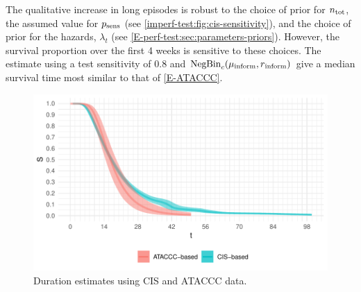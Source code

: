 \documentclass[thesis.tex]{subfiles}
\begin{document}
The qualitative increase in long episodes is robust to the choice of prior for $n_\text{tot}$, the assumed value for $p_\text{sens}$ (see \cref{imperf-test:fig:cis-sensitivity}), and the choice of prior for the hazards, $\lambda_t$ (see \cref{E-perf-test:sec:parameters-priors}).
However, the survival proportion over the first 4 weeks is sensitive to these choices.
The estimate using a test sensitivity of 0.8 and $\operatorname{NegBin}_{c}(\mu{_{\text{inform}}}, r{_{\text{inform}}})$ give a median survival time most similar to that of \cref{E-ATACCC}.
\begin{figure}
  \centering \includegraphics{cis-imperfect-testing/CIS_final}
  \caption{Duration estimates using CIS and ATACCC data.}
  \label{imperf-test:fig:cis-estimates}
\end{figure}
\end{document}
